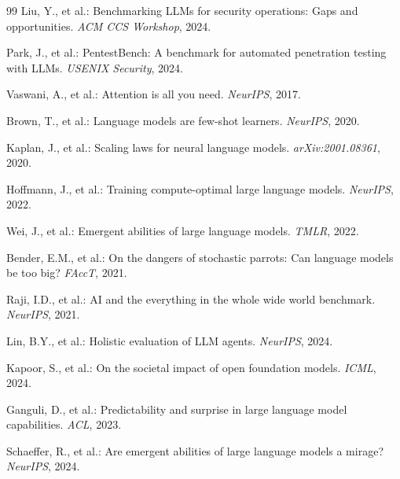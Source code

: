 \documentclass[journal]{IEEEtran}
\begin{document}
\begin{thebibliography}{99}
Liu, Y., et al.: Benchmarking LLMs for security operations: Gaps and opportunities. \emph{ACM CCS Workshop}, 2024.

Park, J., et al.: PentestBench: A benchmark for automated penetration testing with LLMs. \emph{USENIX Security}, 2024.

Vaswani, A., et al.: Attention is all you need. \emph{NeurIPS}, 2017.

Brown, T., et al.: Language models are few-shot learners. \emph{NeurIPS}, 2020.

Kaplan, J., et al.: Scaling laws for neural language models. \emph{arXiv:2001.08361}, 2020.

Hoffmann, J., et al.: Training compute-optimal large language models. \emph{NeurIPS}, 2022.

Wei, J., et al.: Emergent abilities of large language models. \emph{TMLR}, 2022.

Bender, E.M., et al.: On the dangers of stochastic parrots: Can language models be too big? \emph{FAccT}, 2021.

Raji, I.D., et al.: AI and the everything in the whole wide world benchmark. \emph{NeurIPS}, 2021.

Lin, B.Y., et al.: Holistic evaluation of LLM agents. \emph{NeurIPS}, 2024.

Kapoor, S., et al.: On the societal impact of open foundation models. \emph{ICML}, 2024.

Ganguli, D., et al.: Predictability and surprise in large language model capabilities. \emph{ACL}, 2023.

Schaeffer, R., et al.: Are emergent abilities of large language models a mirage? \emph{NeurIPS}, 2024.

\end{thebibliography}
\end{document}
